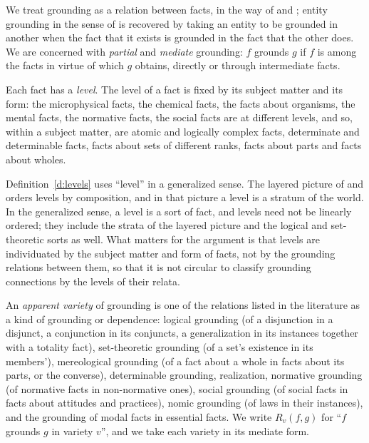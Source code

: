 \documentclass{situationist-preprint}
\begin{document}
We treat grounding as a relation between facts, in the way of \citet{Rosen2010} and \citet{Audi2012}; entity grounding in the sense of \citet{Schaffer2009} is recovered by taking an entity to be grounded in another when the fact that it exists is grounded in the fact that the other does. We are concerned with \emph{partial} and \emph{mediate} grounding: $f$ grounds $g$ if $f$ is among the facts in virtue of which $g$ obtains, directly or through intermediate facts.

\begin{definition}\label{d:levels}
Each fact has a \emph{level}. The level of a fact is fixed by its subject matter and its form: the microphysical facts, the chemical facts, the facts about organisms, the mental facts, the normative facts, the social facts are at different levels, and so, within a subject matter, are atomic and logically complex facts, determinate and determinable facts, facts about sets of different ranks, facts about parts and facts about wholes.
\end{definition}

Definition~\ref{d:levels} uses \enquote{level} in a generalized sense. The layered picture of \citet{OppenheimPutnam1958} and \citet{Kim2002} orders levels by composition, and in that picture a level is a stratum of the world. In the generalized sense, a level is a sort of fact, and levels need not be linearly ordered; they include the strata of the layered picture and the logical and set-theoretic sorts as well. What matters for the argument is that levels are individuated by the subject matter and form of facts, not by the grounding relations between them, so that it is not circular to classify grounding connections by the levels of their relata.

\begin{definition}[Varieties]\label{d:varieties}
An \emph{apparent variety} of grounding is one of the relations listed in the literature as a kind of grounding or dependence: logical grounding (of a disjunction in a disjunct, a conjunction in its conjuncts, a generalization in its instances together with a totality fact), set-theoretic grounding (of a set's existence in its members'), mereological grounding (of a fact about a whole in facts about its parts, or the converse), determinable grounding, realization, normative grounding (of normative facts in non-normative ones), social grounding (of social facts in facts about attitudes and practices), nomic grounding (of laws in their instances), and the grounding of modal facts in essential facts. We write $R_v(f,g)$ for \enquote{$f$ grounds $g$ in variety $v$}, and we take each variety in its mediate form.
\end{definition}
\end{document}
